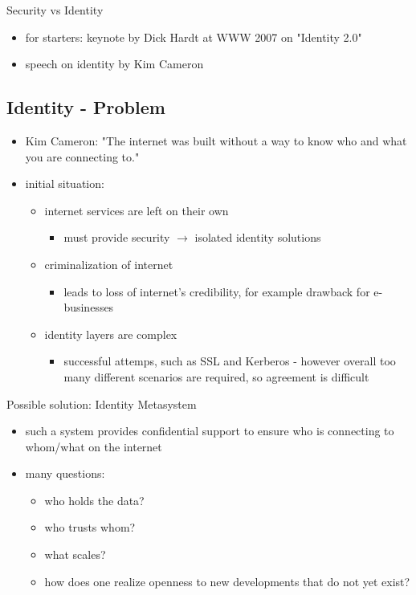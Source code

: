 \documentclass[11pt]{article}
\begin{document}
Security vs Identity
\begin{itemize}
\item for starters: keynote by Dick Hardt at WWW 2007 on "Identity 2.0"
\item speech on identity by Kim Cameron
\end{itemize}

\subsection{Identity - Problem}
\label{sec:org80f20c6}
\begin{itemize}
\item Kim Cameron: "The internet was built without a way to know who and what you are connecting to."
\item initial situation:
\begin{itemize}
\item internet services are left on their own
\begin{itemize}
\item must provide security \(\rightarrow\) isolated identity solutions
\end{itemize}
\item criminalization of internet
\begin{itemize}
\item leads to loss of internet's credibility, for example drawback for e-businesses
\end{itemize}
\item identity layers are complex
\begin{itemize}
\item successful attemps, such as SSL and Kerberos - however overall too many different scenarios are required, so agreement is difficult
\end{itemize}
\end{itemize}
\end{itemize}

Possible solution: Identity Metasystem
\begin{itemize}
\item such a system provides confidential support to ensure who is connecting to whom/what on the internet
\item many questions:
\begin{itemize}
\item who holds the data?
\item who trusts whom?
\item what scales?
\item how does one realize openness to new developments that do not yet exist?
\end{itemize}
\end{itemize}
\end{document}
